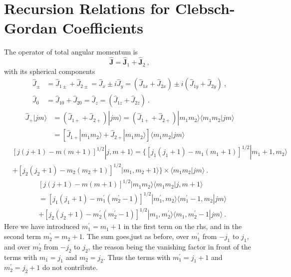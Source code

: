 \documentclass[12pt,a4paper]{article}
\renewcommand{\vec}[1]{\boldsymbol{#1}}
\begin{document}
\section{Recursion Relations for Clebsch-Gordan Coefficients}
\cite{greiner1994quantum} The operator of total angular momentum is
\begin{equation*}
\vec{\hat{J}} = \vec{\hat{J}}_1 +\vec{\hat{J}}_2 ~,
\end{equation*}
with its spherical components
\begin{align*}
\hat{J}_\pm &= \hat{J}_{1\pm} +\hat{J}_{2\pm} = \hat{J}_x \pm i \hat{J}_y = (\hat{J}_{1x} +\hat{J}_{2x}) \pm i (\hat{J}_{1y} +\hat{J}_{2y}) ~, \\
\hat{J}_0 &= \hat{J}_{10} +\hat{J}_{20} = \hat{J}_z = (\hat{J}_{1z} +\hat{J}_{2z} ) ~.
\end{align*}
\begin{align*}
\hat{J}_+ |jm\rangle &= (\hat{J}_{1+} +\hat{J}_{2+}) |jm\rangle = (\hat{J}_{1+} +\hat{J}_{2+}) |m_1 m_2\rangle \langle m_1 m_2 |jm\rangle \\
&= [\hat{J}_{1+} |m_1 m_2\rangle + \hat{J}_{2+}|m_1 m_2\rangle ] \langle m_1 m_2 |jm\rangle
\end{align*}
\begin{align*}
& [j(j + 1) - m(m + 1)]^{1/2} |j,m + 1\rangle = \{ [j_1 (j_1 + 1) - m_1 (m_1 + 1)]^{1/2} | m_1 +1, m_2 \rangle \\
&+ [j_2(j_2 + 1) - m_2(m_2 + 1)]^{1/2} |m_1, m_2 + 1 \rangle \} \times \langle m_1 m_2 | jm \rangle ~.
\end{align*}
\begin{align*}
 & [j(j + 1) - m(m + 1)]^{1/2} |m_1 m_2\rangle \langle m_1 m_2 |j,m + 1\rangle  \\
 &= [j_1 (j_1 + 1) - m^\prime_1 (m^\prime_2 - 1)]^{1/2} | m^\prime_1 , m_2 \rangle \langle m^\prime_1 -1, m_2 | jm \rangle \\
 &+ [j_2 (j_2 + 1) - m^\prime_2 (m^\prime_2 - 1)]^{1/2} | m_1 , m^\prime_2 \rangle \langle m_1 , m^\prime_2 -1 | jm \rangle  ~.
\end{align*}
Here we have introduced $m^\prime_1 = m_1 + 1$ in the first term on the rhs, and in the second term $m^\prime_2 = m_2 + 1$. The sum goes,just as before, over $m^\prime_1$ from $- j_1$ to $j_1$, and over $m^\prime_2$ from $- j_2$ to $j_2$, the reason being the vanishing factor in front of the terms with $m_1 = j_1$ and $m_2 = j_2$. Thus the terms with $m^\prime_1 = j_1 + 1$ and $m^\prime_2 = j_2 + 1$ do not contribute. 
\end{document}
